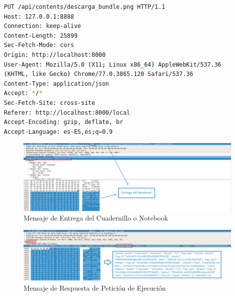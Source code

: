\begin{lstlisting}[language=bash, caption=Ejemplo de la parte HTTP de los mensajes]
PUT /api/contents/descarga_bundle.png HTTP/1.1
Host: 127.0.0.1:8888
Connection: keep-alive
Content-Length: 25899
Sec-Fetch-Mode: cors
Origin: http://localhost:8000
User-Agent: Mozilla/5.0 (X11; Linux x86_64) AppleWebKit/537.36
(KHTML, like Gecko) Chrome/77.0.3865.120 Safari/537.36
Content-Type: application/json
Accept: */*
Sec-Fetch-Site: cross-site
Referer: http://localhost:8000/local
Accept-Encoding: gzip, deflate, br
Accept-Language: es-ES,es;q=0.9
\end{lstlisting}

\begin{figure}[!hbtp]  \centering\noindent
    \includegraphics[width=1.05\textwidth]{figures/notebook_put_request.png}
    \caption{Mensaje de Entrega del Cuadernillo o Notebook}
    \label{nb_put_req}
\end{figure}

\begin{figure}[!hbtp]  \centering\noindent
    \includegraphics[width=1.05\textwidth]{figures/execute_request.png}
    \caption{Mensaje de Respuesta de Petición de Ejecución }
    \label{exec_req}
\end{figure}

